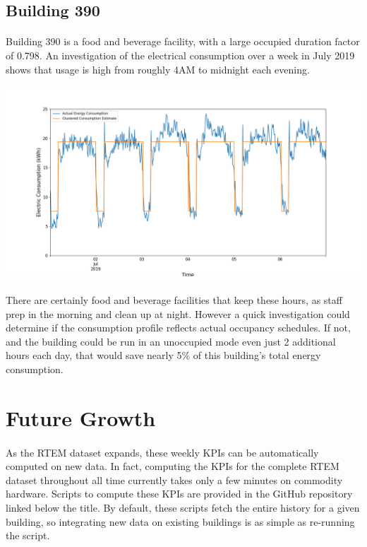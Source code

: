 \documentclass[a4paper]{article}
\begin{document}
\subsection{Building 390}

\paragraph{}
Building 390 is a food and beverage facility, with a large occupied duration factor of 0.798. An investigation of the electrical consumption over a week in July 2019 shows that usage is high from roughly 4AM to midnight each evening.

\includegraphics[width=.9\columnwidth]{./images/390_Duration.png}

\paragraph{}
There are certainly food and beverage facilities that keep these hours, as staff prep in the morning and clean up at night. However a quick investigation could determine if the consumption profile reflects actual occupancy schedules. If not, and the building could be run in an unoccupied mode even just 2 additional hours each day, that would save nearly 5\% of this building's total energy consumption.

\section{Future Growth}

\paragraph{}
As the RTEM dataset expands, these weekly KPIs can be automatically computed on new data. In fact, computing the KPIs for the complete RTEM dataset throughout all time currently takes only a few minutes on commodity hardware. Scripts to compute these KPIs are provided in the GitHub repository linked below the title. By default, these scripts fetch the entire history for a given building, so integrating new data on existing buildings is as simple as re-running the script.
\end{document}
